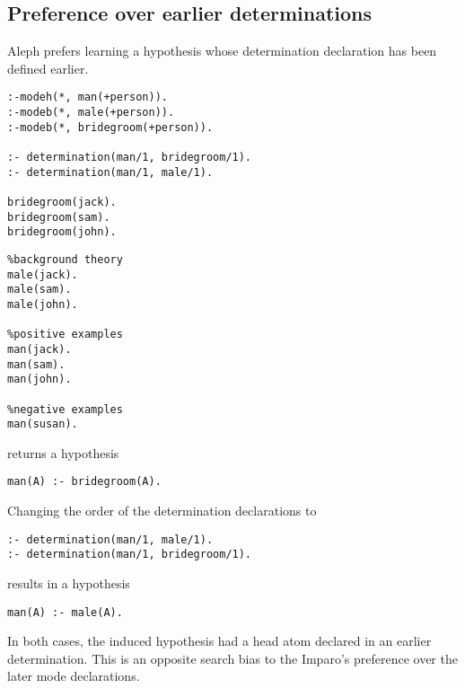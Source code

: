 \subsection{Preference over earlier determinations}
Aleph prefers learning a hypothesis whose determination declaration has been defined earlier.

\begin{minipage}[t]{.60\textwidth}
\begin{lstlisting}
:-modeh(*, man(+person)).
:-modeb(*, male(+person)).
:-modeb(*, bridegroom(+person)).

:- determination(man/1, bridegroom/1).
:- determination(man/1, male/1).

bridegroom(jack).
bridegroom(sam).
bridegroom(john).
\end{lstlisting}
\end{minipage}
\begin{minipage}[t]{.20\textwidth}
\begin{lstlisting}
%background theory
male(jack).
male(sam).
male(john).

%positive examples
man(jack).
man(sam).
man(john).

%negative examples
man(susan).
\end{lstlisting}
\end{minipage}

returns a hypothesis
\begin{lstlisting}
man(A) :- bridegroom(A).
\end{lstlisting}

Changing the order of the determination declarations to
\begin{lstlisting}
:- determination(man/1, male/1).
:- determination(man/1, bridegroom/1).
\end{lstlisting}
results in a hypothesis
\begin{lstlisting}
man(A) :- male(A).
\end{lstlisting}
In both cases, the induced hypothesis had a head atom declared in an earlier determination. This is an opposite search bias to the Imparo's preference over the later mode declarations.
